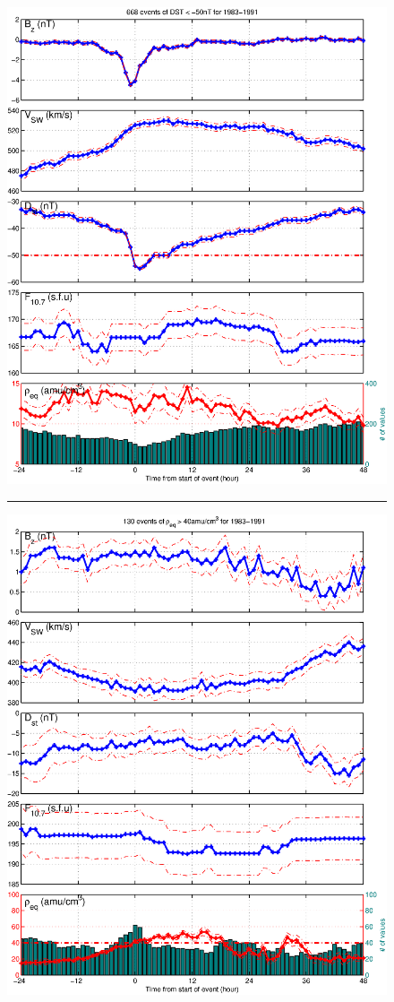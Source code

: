 \documentclass[10pt,twocolumn]{article}
\begin{document}
\begin{figure}[tp!]
\centering
\includegraphics[scale=0.40]{paperfigures/stormavs-dst.eps}
\rule[1ex]{5cm}{1pt}
\includegraphics[scale=0.40]{paperfigures/stormavs-mass.eps}

\end{figure}
\end{document}
